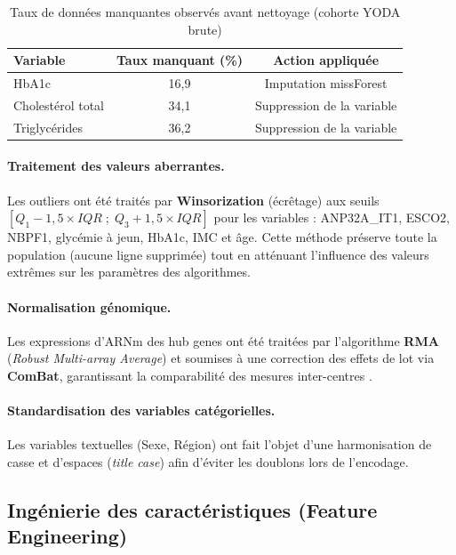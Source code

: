 \begin{table}[h!]
\centering
\caption{Taux de données manquantes observés avant nettoyage (cohorte YODA brute)}
\label{tab:missing}
\begin{tabular}{lcc}
\hline
\textbf{Variable} & \textbf{Taux manquant (\%)} & \textbf{Action appliquée} \\
\hline
HbA1c              & 16{,}9                   & Imputation missForest \\
Cholestérol total  & 34{,}1                   & Suppression de la variable \\
Triglycérides      & 36{,}2                   & Suppression de la variable \\
\hline
\end{tabular}
\end{table}

\paragraph{Traitement des valeurs aberrantes.}
Les outliers ont été traités par \textbf{Winsorization} (écrêtage) aux seuils
$[Q_1 - 1{,}5 \times IQR \;;\; Q_3 + 1{,}5 \times IQR]$ pour les variables :
ANP32A\_IT1, ESCO2, NBPF1, glycémie à jeun, HbA1c, IMC et âge. Cette méthode préserve
toute la population (aucune ligne supprimée) tout en atténuant l'influence des
valeurs extrêmes sur les paramètres des algorithmes.

\paragraph{Normalisation génomique.}
Les expressions d'ARNm des hub genes ont été traitées par l'algorithme
\textbf{RMA} (\textit{Robust Multi-array Average}) et soumises à une correction
des effets de lot via \textbf{ComBat}, garantissant la comparabilité des mesures
inter-centres \cite{wang2023genemodel}.

\paragraph{Standardisation des variables catégorielles.}
Les variables textuelles (Sexe, Région) ont fait l'objet d'une harmonisation de casse
et d'espaces (\textit{title case}) afin d'éviter les doublons lors de l'encodage.

\subsection{Ingénierie des caractéristiques (Feature Engineering)}
\label{subsec:feateng}

